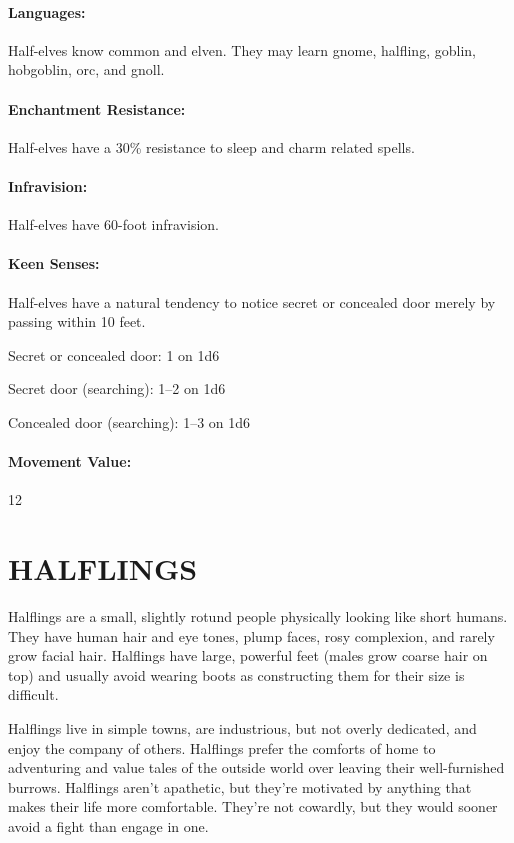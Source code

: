 \begin{multicols}{2}
\paragraph{Languages:} Half-elves know common and elven.  They may learn gnome, halfling, goblin, hobgoblin, orc, and gnoll.  

\paragraph{Enchantment Resistance:} Half-elves have a 30\% resistance to sleep and charm related spells.

\paragraph{Infravision:} Half-elves have 60-foot infravision.

\paragraph{Keen Senses:} Half-elves have a natural tendency to notice secret or concealed door merely by passing within 10 feet.

Secret or concealed door: 1 on 1d6

Secret door (searching): 1--2 on 1d6

Concealed door (searching): 1--3 on 1d6

\paragraph{Movement Value:} 12

\section{HALFLINGS}

Halflings are a small, slightly rotund people physically looking like short humans.  They have human hair and eye tones, plump faces, rosy complexion, and rarely grow facial hair.  Halflings have large, powerful feet (males grow coarse hair on top) and usually avoid wearing boots as constructing them for their size is difficult.  

Halflings live in simple towns, are industrious, but not overly dedicated, and enjoy the company of others.  Halflings prefer the comforts of home to adventuring and value tales of the outside world over leaving their well-furnished burrows.  Halflings aren't apathetic, but they're motivated by anything that makes their life more comfortable.  They're not cowardly, but they would sooner avoid a fight than engage in one.


\end{multicols}
